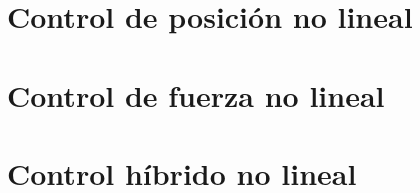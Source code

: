 




\setmainfont{AvenirLTStd-Roman}



\setmainfont{Calibri}


\tableofcontents
\newpage


\section{Control de posición no lineal}


\section{Control de fuerza no lineal}


\section{Control híbrido no lineal}


%

